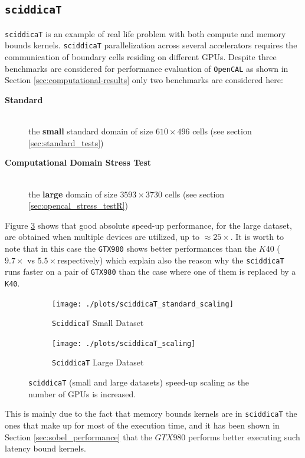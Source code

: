 \subsection{\texttt{sciddicaT}}
\texttt{sciddicaT} is an example of real life problem with both compute and memory bounds kernels. \texttt{sciddicaT} parallelization across several accelerators requires the communication of boundary cells residing on different GPUs.
Despite three benchmarks are considered for performance evaluation of \texttt{OpenCAL} as shown in Section \ref{sec:computational-results} only two benchmarks are considered here: 
\begin{description}
	\item[\textbf{Standard}]\hfil \\ the \textbf{small} standard domain of size $610 \times 496$ cells (see section \ref{sec:standard_tests})
	\item[\textbf{Computational Domain Stress Test}]\hfil \\ the \textbf{large}  domain of size $3593 \times 3730$ cells (see section \ref{sec:opencal_stress_testR})
\end{description}
Figure \ref{fig:sciddica_scaling} shows that good absolute speed-up performance, for the large dataset, are obtained when multiple devices are utilized, up to $\approx 25 \times$. It is worth to note that in this case the \texttt{GTX980} shows better performances than the $K40$ ( $9.7\times$ vs  $5.5 \times$respectively) which explain also the reason why the \texttt{sciddicaT} runs faster on a pair of \texttt{GTX980} than the case where one of them is replaced by a \texttt{K40}.
\begin{figure}[!htb]	
	\begin{subfigure}{1.0\textwidth}
		\caption{\texttt{SciddicaT} Small Dataset}
		\label{fig:sciddica_standard_scaling}
		\texttt{[image: ./plots/sciddicaT\_standard\_scaling]}
	\end{subfigure}
	\endminipage
	
	\begin{subfigure}{1.0\textwidth}
		\caption{\texttt{SciddicaT} Large Dataset}
		\label{fig:sciddica_stress_scaling}
		\texttt{[image: ./plots/sciddicaT\_scaling]}
	\end{subfigure}
	\endminipage\hfill
	\caption[]{\texttt{sciddicaT} (small and large datasets) speed-up scaling as the number of GPUs is increased.}
	\label{fig:sciddica_scaling}
\end{figure}
This is mainly due to the fact that memory bounds kernels are in \texttt{sciddicaT} the ones that make up for most of the execution time, and it has been shown in Section \ref{sec:sobel_performance} that the $GTX980$ performs better executing such latency bound kernels.
